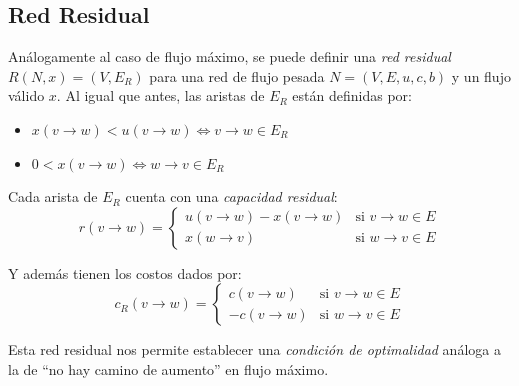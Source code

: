 \documentclass[a4paper]{report}
\newcommand{\si}{\text{si }}
\begin{document}
\subsection{Red Residual}

Análogamente al caso de flujo máximo, se puede definir una \textit{red residual} $R(N, x) = (V, E_R)$ para una red de flujo pesada $N = (V, E, u, c, b)$ y un flujo válido $x$. Al igual que antes, las aristas de $E_R$ están definidas por:
\begin{itemize}
    \item $x(v \rightarrow w) < u(v \rightarrow w) \iff v \rightarrow w \in E_R$
    \item $0 < x(v \rightarrow w) \iff w \rightarrow v \in E_R$
\end{itemize}

Cada arista de $E_R$ cuenta con una \textit{capacidad residual}:
$$
    r(v \rightarrow w) =
    \begin{cases}
        u(v \rightarrow w) - x(v \rightarrow w) & \si v \rightarrow w \in E \\
        x(w \rightarrow v)                      & \si w \rightarrow v \in E
    \end{cases}
$$

Y además tienen los costos dados por:
$$
    c_R(v \rightarrow w) =
    \begin{cases}
        c(v \rightarrow w)  & \si v \rightarrow w \in E \\
        -c(v \rightarrow w) & \si w \rightarrow v \in E
    \end{cases}
$$

Esta red residual nos permite establecer una \textit{condición de optimalidad} análoga a la de ``no hay camino de aumento'' en flujo máximo.
\end{document}
